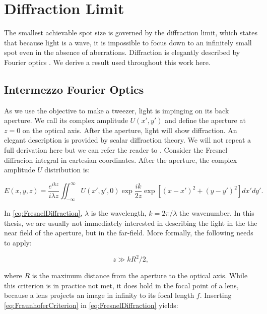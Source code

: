 \section{Diffraction Limit}

The smallest achievable spot size is governed by the diffraction limit, which states that because light is a wave, it is impossible to focus down to an infinitely small spot even in the absence of aberrations.
Diffraction is elegantly described by Fourier optics \cite{Goodman2005}. 
We derive a result used throughout this work here.

\begin{mdframed}
    \subsection*{Intermezzo Fourier Optics}
    
    As we use the objective to make a tweezer, light is impinging on its back aperture. 
    We call its complex amplitude $U(x',y')$ and define the aperture at $z = 0$ on the optical axis.
    After the aperture, light will show diffraction. 
    An elegant description is provided by scalar diffraction theory.
    We will not repeat a full derivation here but we can refer the reader to \cite{Goodman2005}.
    Consider the Fresnel diffracion integral in cartesian coordinates. 
    After the aperture, the complex amplitude $U$ distribution is:
    
    \begin{equation}\label{eq:FresnelDiffraction}
        E(x,y,z) = 
        \frac{e^{ikz}}{i \lambda z} \iint_{-\infty}^{\infty} U(x',y',0) \exp{\frac{ik}{2z}} \exp{\left[(x-x')^2+(y-y')^2\right]} dx'dy'.
    \end{equation}
    
    In \cref{eq:FresnelDiffraction}, $\lambda$ is the wavelength, $k=2\pi/\lambda$ the wavenumber.
    In this thesis, we are usually not immediately interested in describing the light in the the near field of the aperture, but in the far-field. 
    More formally, the following needs to apply:
    
    \begin{equation}\label{eq:FraunhoferCriterion}
        z \gg k R^2/2,
    \end{equation}
    
    where $R$ is the maximum distance from the aperture to the optical axis. 
    While this criterion is in practice not met, it does hold in the focal point of a lens, because a lens projects an image in infinity to its focal length $f$. 
    Inserting \cref{eq:FraunhoferCriterion} in \cref{eq:FresnelDiffraction} yields:
    

\end{mdframed}
